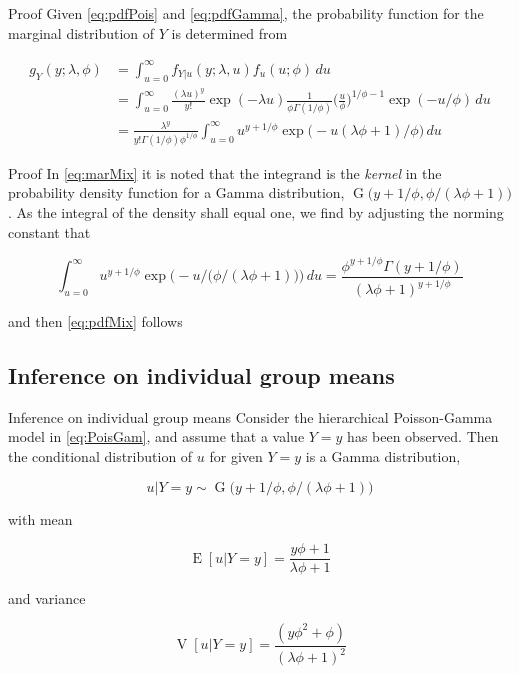 \documentclass[aspectratio=169]{beamer}
\DeclareMathOperator{\E}{E}
\DeclareMathOperator{\V}{V}
\DeclareMathOperator{\G}{G}
\begin{document}
\begin{frame}{Proof}
\protect\hypertarget{proof-1}{}
Given \eqref{eq:pdfPois} and \eqref{eq:pdfGamma}, the probability
function for the marginal distribution of \(Y\) is determined from

\begin{equation} \label{eq:marMix}
  \begin{aligned}
    g_{Y}(y;\lambda,\phi)&=\int_{u=0}^\infty f_{Y|u}(y;\lambda, u) f_{u}(u;\phi) \,du \\
    &=\int_{u=0}^\infty \frac{(\lambda u)^y}{y!} \exp (-\lambda u) \frac{1}{\phi \Gamma(1/\phi)} \bigg(\frac{u}{\phi}\bigg)^{1/\phi-1} \exp (-u/\phi) \,du\\
    &=\frac{\lambda^{y}}{y!\Gamma(1/\phi)\phi^{1/\phi}} \int_{u=0}^\infty u^{y+1/\phi} \exp \big(-u(\lambda \phi+1)/\phi\big) \,du
  \end{aligned}
\end{equation}
\end{frame}

\begin{frame}{Proof}
\protect\hypertarget{proof-2}{}
In \eqref{eq:marMix} it is noted that the integrand is the \emph{kernel}
in the probability density function for a Gamma distribution,
\(\G\big(y+1/\phi,\phi/(\lambda \phi+1)\big)\). As the integral of the
density shall equal one, we find by adjusting the norming constant that

\begin{equation}
  \int_{u=0}^\infty u^{y+1/\phi} \exp \bigg(-u/\Big(\phi/(\lambda \phi+1)\Big)\bigg) \,du = \frac{\phi^{y+1/\phi}\Gamma(y+1/\phi)}{(\lambda \phi + 1)^{y+1/\phi}}
\end{equation}

and then \eqref{eq:pdfMix} follows
\end{frame}

\hypertarget{inference-on-individual-group-means}{%
\subsection{Inference on individual group
means}\label{inference-on-individual-group-means}}

\begin{frame}{Inference on individual group means}
Consider the hierarchical Poisson-Gamma model in \eqref{eq:PoisGam}, and
assume that a value \(Y=y\) has been observed. Then the conditional
distribution of \(u\) for given \(Y=y\) is a Gamma distribution,

\begin{equation}
  u|Y=y\sim \G\big(y+1/\phi,\phi/(\lambda \phi+1)\big)
\end{equation}

with mean

\begin{equation}
  \E[u|Y=y]=\frac{y\phi+1}{\lambda\phi+1}
\end{equation}

and variance

\begin{equation}
  \V[u|Y=y]=\frac{(y \phi^2+\phi)}{(\lambda \phi + 1)^2}
\end{equation}
\end{frame}
\end{document}
